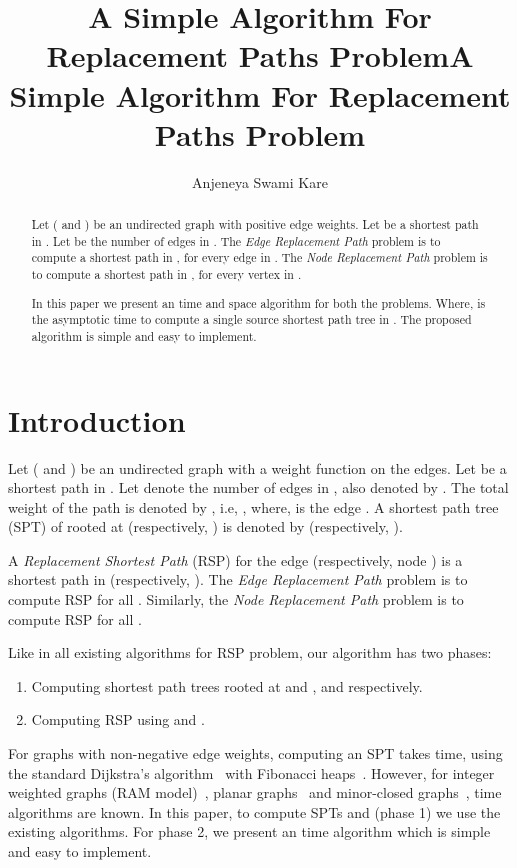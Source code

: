 \documentclass[11pt,a4paper]{llncs}
\begin{document}
\title{A Simple Algorithm For Replacement Paths Problem}
\title{A Simple Algorithm For Replacement Paths Problem}
\author{Anjeneya Swami Kare}

\maketitle
\begin{abstract}
 Let  ( and ) be an undirected graph with positive edge weights.
 Let  be a shortest  path in . Let  be the number of edges in .
 The \emph{Edge Replacement Path}  problem is to compute a shortest  path in , for every edge
  in . The \emph{Node Replacement Path} problem is to compute a shortest
  path in , for every vertex  in .

 In this paper we present an  time and  space algorithm
 for both the problems. Where,  is the asymptotic time to compute a single source
 shortest path tree in . The proposed algorithm is simple and easy to implement.
 \end{abstract}


\section{Introduction}
Let  ( and ) be an undirected graph with a weight
function  on the edges.
Let  be a shortest
 path in . Let  denote the  number of edges in , also denoted by .
The total weight of the path  is denoted by ,
i.e, , where,  is the
edge . A shortest path tree (SPT) of  rooted at  
(respectively, ) is denoted by  (respectively, ).

A \emph{Replacement Shortest Path} (RSP) for the edge 
(respectively, node ) is a shortest  path in 
(respectively, ). The \emph{Edge Replacement Path} problem is to compute
RSP for all . Similarly, the \emph{Node Replacement Path}
problem is to compute RSP for all . 

Like in all existing algorithms for RSP problem, our algorithm has two phases:
\begin{enumerate}
  \item Computing shortest path trees rooted at  and ,  and  respectively.
  \item Computing RSP using  and .
\end{enumerate}
For graphs with non-negative edge weights, computing
an SPT takes  time, using the standard Dijkstra's algorithm~\cite{dijkstra} with
Fibonacci heaps~\cite{fheaps}. However, for integer weighted graphs (RAM model)~\cite{thorup},
planar graphs~\cite{planarspt} and minor-closed graphs~\cite{minorspt},
 time algorithms are known. In this paper, to compute SPTs  and  (phase 1)
we use the existing algorithms. For phase 2, we present an  time algorithm
which is simple and easy to implement.
\end{document}
